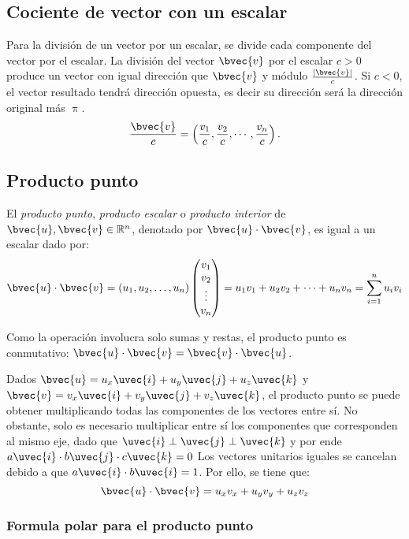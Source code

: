 \documentclass{fmbnotes}
\begin{document}
\subsection{Cociente de vector con un escalar}

Para la división de un vector por un escalar, se divide cada componente del vector por el escalar. La división del vector \( \bvec{v} \) por el escalar \( c > 0 \) produce un vector con igual dirección que \( \bvec{v} \) y módulo \(\frac{\left|\bvec{v}\right|}{c}\). Si \( c < 0 \), el vector resultado tendrá dirección opuesta, es decir su dirección será la dirección original más \(\uppi\). 
\[\frac{\bvec{v}}{c}=\left(\frac{v_1}{ c},\frac{v_2} {c},\cdots,\frac{v_n}{c}\right).\]

\subsection{Producto punto}

El \emph{producto punto}, \emph{producto escalar} o \emph{producto interior} de \( \bvec{u}, \bvec{v} \in \mathbb{R}^{n} \), denotado por \( \bvec{u} \cdot \bvec{v}\), es igual a un escalar dado por:
\[\bvec{u} \cdot \bvec{v}=(u_1,u_2,\ldots,u_n) \begin{pmatrix}
v_1 \\ v_2 \\ \vdots \\ v_n
\end{pmatrix} = u_1 v_1 + u_2 v_2 + \cdots + u_n v_n=\sum_{i=1}^{n}u_i v_i\]

Como la operación involucra solo sumas y restas, el producto punto es conmutativo: \( \bvec{u} \cdot \bvec{v} = \bvec{v} \cdot \bvec{u}\).

Dados \(\bvec{u} = u_x\uvec{i}+u_y\uvec{j}+u_z\uvec{k}\) y \(\bvec{v} = v_x\uvec{i}+v_y\uvec{j}+v_z\uvec{k}\), el producto punto se puede obtener multiplicando todas las componentes de los vectores entre sí. No obstante, solo es necesario multiplicar entre sí los componentes que corresponden al mismo eje, dado que \(\uvec{i} \perp \uvec{j} \perp \uvec{k}\) y por ende \(a\uvec{i}\cdot b\uvec{j} \cdot c \uvec{k}=0\)
Los vectores unitarios iguales se cancelan debido a que \(a\uvec{i}\cdot b\uvec{i}=1\). Por ello, se tiene que:
\[\bvec{u} \cdot \bvec{v}=u_x v_x + u_y v_y + u_z v_z\]

\subsubsection{Formula polar para el producto punto}
\end{document}
